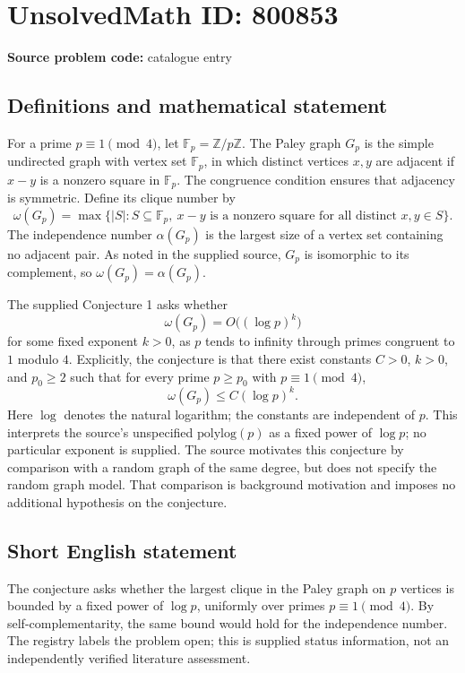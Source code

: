 \documentclass[11pt]{article}
\newcommand{\Z}{\mathbb{Z}}
\newcommand{\F}{\mathbb{F}}
\begin{document}
\section*{UnsolvedMath ID: 800853}
\textbf{Source problem code:} catalogue entry
\subsection{Definitions and mathematical statement}
For a prime \(p\equiv 1\pmod 4\), let \(\F_p=\Z/p\Z\). The Paley graph \(G_p\) is the simple undirected graph with vertex set \(\F_p\), in which distinct vertices \(x,y\) are adjacent if \(x-y\) is a nonzero square in \(\F_p\). The congruence condition ensures that adjacency is symmetric. Define its clique number by
\[
\omega(G_p)=\max\bigl\{|S|:S\subseteq\F_p,\ x-y\text{ is a nonzero square for all distinct }x,y\in S\bigr\}.
\]
The independence number \(\alpha(G_p)\) is the largest size of a vertex set containing no adjacent pair. As noted in the supplied source, \(G_p\) is isomorphic to its complement, so \(\omega(G_p)=\alpha(G_p)\).

The supplied Conjecture 1 asks whether
\[
\omega(G_p)=O\bigl((\log p)^k\bigr)
\]
for some fixed exponent \(k>0\), as \(p\) tends to infinity through primes congruent to \(1\) modulo \(4\). Explicitly, the conjecture is that there exist constants \(C>0\), \(k>0\), and \(p_0\geq 2\) such that for every prime \(p\geq p_0\) with \(p\equiv1\pmod4\),
\[
\omega(G_p)\leq C(\log p)^k.
\]
Here \(\log\) denotes the natural logarithm; the constants are independent of \(p\). This interprets the source's unspecified \(\mathrm{polylog}(p)\) as a fixed power of \(\log p\); no particular exponent is supplied. The source motivates this conjecture by comparison with a random graph of the same degree, but does not specify the random graph model. That comparison is background motivation and imposes no additional hypothesis on the conjecture.
\subsection{Short English statement}
The conjecture asks whether the largest clique in the Paley graph on \(p\) vertices is bounded by a fixed power of \(\log p\), uniformly over primes \(p\equiv1\pmod4\). By self-complementarity, the same bound would hold for the independence number. The registry labels the problem open; this is supplied status information, not an independently verified literature assessment.
\end{document}
